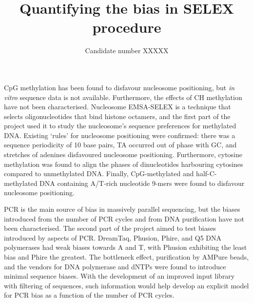\documentclass[parskip=full, numbers=noenddot]{scrbook}
\title{Quantifying the bias in SELEX procedure}
\author{Candidate number XXXXX}
\newenvironment{abstract}%
{\cleardoublepage\null \vfill\begin{center}%
    \bfseries \abstractname \end{center}}%
    {\vfill \null}
\begin{document}

\frontmatter

\maketitle

\begin{abstract}
  
  CpG methylation has been found to disfavour nucleosome positioning, but \emph{in vitro} sequence data is not available.  Furthermore, the effects of CH methylation have not been characterised.  Nucleosome EMSA-SELEX is a technique that selects oligonucleotides that bind histone octamers, and the first part of the project used it to study the nucleosome's sequence preferences for methylated DNA.  Existing `rules' for nucleosome positioning were confirmed: there was a sequence periodicity of 10 base pairs, TA occurred out of phase with GC, and stretches of adenines disfavoured nucleosome positioning.  Furthermore, cytosine methylation was found to align the phases of dinucleotides harbouring cytosines compared to unmethylated DNA.  Finally, CpG-methylated and half-C-methylated DNA containing A/T-rich nucleotide 9-mers were found to disfavour nucleosome positioning.

  PCR is the main source of bias in massively parallel sequencing, but the biases introduced from the number of PCR cycles and from DNA purification have not been characterised.  The second part of the project aimed to test biases introduced by aspects of PCR.  DreamTaq, Phusion, Phire, and Q5 DNA polymerases had weak biases towards A and T, with Phusion exhibiting the least bias and Phire the greatest.  The bottleneck effect, purification by AMPure beads, and the vendors for DNA polymerase and dNTPs were found to introduce minimal sequence biases.  With the development of an improved input library with filtering of sequences, such information would help develop an explicit model for PCR bias as a function of the number of PCR cycles.
 
\end{abstract}
\end{document}
